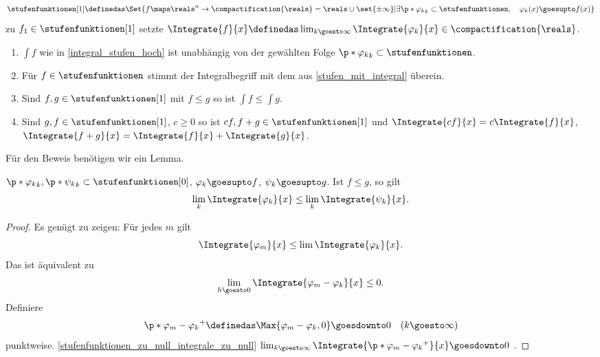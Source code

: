 \begin{definition}\label{integral_stufen_hoch}
  \begin{equation*}
    \stufenfunktionen[1]\definedas \Set{f\maps \reals^n\to \compactification{\reals}=\reals\cup \set{\pm \infty}|\exists \p*{\varphi_k}_k\subset \stufenfunktionen,\quad \varphi_k(x)\goesupto f(x)}
  \end{equation*}
  zu \( f_1\in \stufenfunktionen[1] \) setzte \( \Integrate{f}{x}\definedas \lim_{k \goesto \infty}\Integrate{\varphi_k}{x}\in \compactification{\reals} \).
\end{definition}
\begin{satz}\label{integral_stufen_hoch_eigenschaften}
  \begin{enumerate}
    \item \label{integral_stufen_hoch_unabhaengig_von_stufenfolge}\( \int f \) wie in \ref{integral_stufen_hoch} ist unabhängig von der gewählten Folge \( \p*{\varphi_k}_k\subset \stufenfunktionen \).
    \item \label{integral_stufen_hoch_gleich_stufenintegral} Für \( f\in \stufenfunktionen \) stimmt der Integralbegriff mit dem aus \ref{stufen_mit_integral} überein.
    \item \label{integral_stufen_hoch_funktionenungleichung_integralungleichung} Sind \( f,g\in \stufenfunktionen[1] \) mit \( f\leq g \) so ist \( \int f\leq \int g \).
    \item \label{integral_stufen_hoch_linear} Sind \( g,f\in \stufenfunktionen[1] \), \( c\geq 0 \) so ist \( cf,f+g\in \stufenfunktionen[1] \) und \( \Integrate{cf}{x}=c\Integrate{f}{x} \), \( \Integrate{f+g}{x}=\Integrate{f}{x}+\Integrate{g}{x} \).
  \end{enumerate}
\end{satz}
Für den Beweis benötigen wir ein Lemma.
\begin{lemma}\label{funktionenungleichung_grenzwertungleichung_stufenfunktionen_hoch_zu}
  \( \p*{\varphi_k}_k,\p*{\psi_k}_k\subset \stufenfunktionen[0] \), \( \varphi_k\goesupto f \), \( \psi_k\goesupto g \). Ist \( f\leq g \), so gilt
  \begin{equation*}
    \lim_k \Integrate{\varphi_k}{x}\leq \lim_k \Integrate{\psi_k}{x}.
  \end{equation*}
\end{lemma}
\begin{proof}
  Es genügt zu zeigen: Für jedes \( m \) gilt
  \begin{equation*}
    \Integrate{\varphi_m}{x}\leq \lim \Integrate{\varphi_k}{x}.
  \end{equation*}
  Das ist äquivalent zu
  \begin{equation*}
    \lim_{h \goesto 0}\Integrate{\varphi_m-\varphi_k}{x}\leq 0.
  \end{equation*}
  Definiere
  \begin{equation*}
    \p*{\varphi_m-\varphi_k}^{+}\definedas \Max{\varphi_m-\varphi_k,0}\goesdownto 0 \quad (k\goesto \infty)
  \end{equation*}
  punktweise. \ref{stufenfunktionen_zu_null_integrale_zu_null} \timplies \( \lim_{k\goesto \infty}\Integrate{\p*{\varphi_m-\varphi_k}^{+}}{x}\goesdownto 0 \) \timplies \Beh.
\end{proof}
